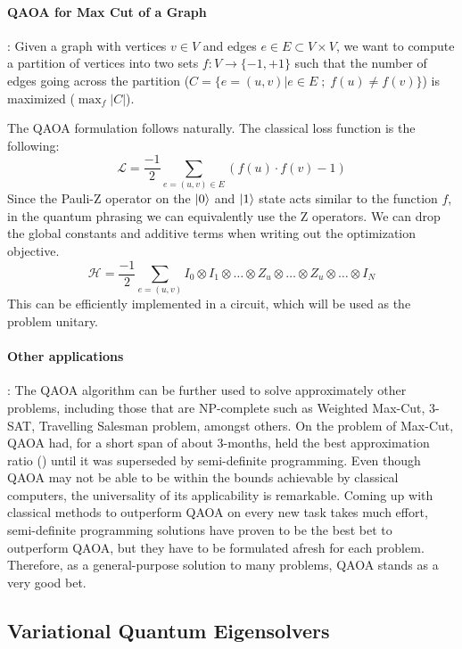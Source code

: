 \paragraph*{QAOA for Max Cut of a Graph}: Given a graph with vertices $v \in V$ and edges $e \in E \subset V \times V$, we want to compute a partition of vertices into two sets $f: V \rightarrow \{-1, +1\}$ such that the number of edges going across the partition ($C = \{ e = (u, v) | e \in E \;;\; f(u) \neq f(v) \}$) is maximized ($\max_{f} |C|$).

The QAOA formulation follows naturally. The classical loss function is the following:
\begin{equation}
    \mathcal{L} = \frac{-1}{2} \sum_{e = (u, v) \in E} (f(u) \cdot f(v) - 1)
\end{equation}
Since the Pauli-Z operator on the $\ket{0}$ and $\ket{1}$ state acts similar to the function $f$, in the quantum phrasing we can equivalently use the Z operators. We can drop the global constants and additive terms when writing out the optimization objective.
\begin{equation}
    \mathcal{H} = \frac{-1}{2} \sum_{e = (u, v)} I_0 \otimes I_1 \otimes \ldots \otimes Z_u \otimes \ldots \otimes Z_u \otimes \ldots \otimes I_N
\end{equation}
This can be efficiently implemented in a circuit, which will be used as the problem unitary.

\paragraph*{Other applications}: The QAOA algorithm can be further used to solve approximately other problems, including those that are NP-complete such as Weighted Max-Cut, 3-SAT, Travelling Salesman problem, amongst others. On the problem of Max-Cut, QAOA had, for a short span of about 3-months, held the best approximation ratio (\cite{qaoa-max-cut-farhi}) until it was superseded by semi-definite programming. Even though QAOA may not be able to be within the bounds achievable by classical computers, the universality of its applicability is remarkable. Coming up with classical methods to outperform QAOA on every new task takes much effort, semi-definite programming solutions have proven to be the best bet to outperform QAOA, but they have to be formulated afresh for each problem. Therefore, as a general-purpose solution to many problems, QAOA stands as a very good bet.


\subsection{Variational Quantum Eigensolvers}

